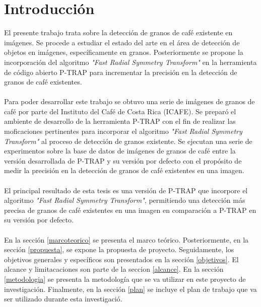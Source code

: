 \section{\textbf{Introducci\'on}}\label{introduccion}
El presente trabajo trata sobre la detecci\'on de granos de caf\'e existente en im\'agenes. 
Se procede a estudiar el estado del arte en el \'area de detecci\'on de objetos en im\'agenes, espec\'ificamente en granos. 
Posteriormente se propone la incorporaci\'on del algoritmo \textit{"Fast Radial Symmetry Transform"}\cite{loyzelinsky} en la herramienta de c\'odigo abierto P-TRAP\cite{ptrap} para incrementar la precisi\'on en la detecci\'on de granos de caf\'e existentes. 
\\\\
Para poder desarrollar este trabajo se obtuvo una serie de im\'agenes de granos de caf\'e por parte del Instituto del Caf\'e de Costa Rica (ICAFE). Se prepar\'o el ambiente de desarrollo de la herramienta P-TRAP\cite{ptrap} con el fin de realizar las moficaciones pertinentes para incorporar el algoritmo \textit{"Fast Radial Symmetry Transform"}\cite{loyzelinsky} al proceso de detecci\'on de granos existente. Se ejecutan una serie de experimentos sobre la base de datos de im\'agenes de granos de caf\'e entre la versi\'on desarrollada de P-TRAP\cite{ptrap} y su versi\'on por defecto con el prop\'osito de medir la precisi\'on en la detecci\'on de granos de caf\'e existentes en una imagen.
\\\\
El principal resultado de esta tesis es una versi\'on de P-TRAP\cite{ptrap} que incorpore el algoritmo \textit{"Fast Radial Symmetry Transform"}\cite{loyzelinsky}, permitiendo una detecci\'on m\'as precisa de granos de caf\'e existentes en una imagen en comparaci\'on a P-TRAP\cite{ptrap} en su versi\'on por defecto. 
\\\\
En la secci\'on \ref{marcoteorico} se presenta el marco te\'orico. Posteriormente, en la secci\'on \ref{propuesta}, se expone la propuesta de proyecto. Seguidamente, los objetivos generales y espec\'ificos son presentados en la secci\'on \ref{objetivos}. El alcance y limitacaciones son parte de la seccion \ref{alcance}. En la secci\'on \ref{metodologia} se presenta la metodolog\'ia que se va utilizar en este proyecto de investigaci\'on. Finalmente, en la secci\'on \ref{plan} se incluye el plan de trabajo que va ser utilizado durante esta investigaci\'o.



